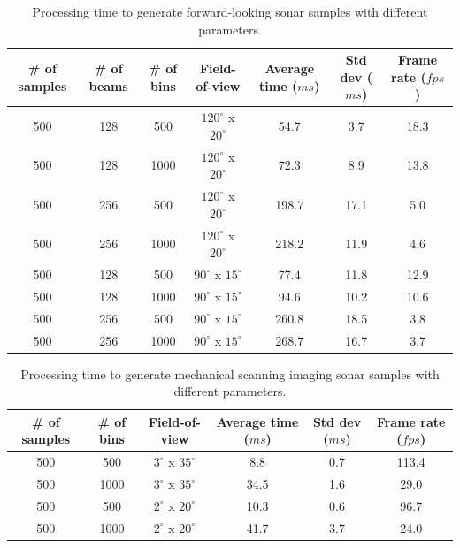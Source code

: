 \documentclass[final,5p,times]{elsarticle}
\begin{document}
\begin{table}[t]
    \caption{Processing time to generate forward-looking sonar samples with different parameters.}
    \captionsetup{justification=justified}
    \label{table:fls}
    \begin{center}
        \begin{tabular}{| c | c | c | c | c | c | c |}
            \hline
            \# of samples & \# of beams & \# of bins & Field-of-view & Average time ($ms$) & Std dev ($ms$) & Frame rate ($fps$) \\
            \hline
            500     & 128     & 500       & $120^{\circ}$ x $20^{\circ}$        & 54.7    & 3.7   & 18.3 \\ \hline
            500     & 128     & 1000      & $120^{\circ}$ x $20^{\circ}$        & 72.3	& 8.9   & 13.8 \\ \hline
            500     & 256     & 500       & $120^{\circ}$ x $20^{\circ}$        & 198.7	& 17.1  & 5.0  \\ \hline
            500     & 256     & 1000      & $120^{\circ}$ x $20^{\circ}$        & 218.2	& 11.9  & 4.6  \\ \hline
            500     & 128     & 500       & $90^{\circ}$ x $15^{\circ}$         & 77.4	& 11.8  & 12.9 \\ \hline
            500     & 128     & 1000      & $90^{\circ}$ x $15^{\circ}$         & 94.6	& 10.2  & 10.6 \\ \hline
            500     & 256     & 500       & $90^{\circ}$ x $15^{\circ}$         & 260.8	& 18.5  & 3.8  \\ \hline
            500     & 256     & 1000      & $90^{\circ}$ x $15^{\circ}$         & 268.7	& 16.7  & 3.7  \\ \hline
        \end{tabular}
    \end{center}
\end{table}

\begin{table}
    \caption{Processing time to generate mechanical scanning imaging sonar samples with different parameters.}
    \captionsetup{justification=justified}
    \label{table:msis}
    \begin{center}
        \begin{tabular}{| c | c | c | c | c | c |}
            \hline
            \# of samples & \# of bins & Field-of-view & Average time ($ms$) & Std dev ($ms$) & Frame rate ($fps$) \\
            \hline
            500     & 500       & $3^{\circ}$ x $35^{\circ}$        & 8.8	    & 0.7  & 113.4 \\ \hline
            500     & 1000      & $3^{\circ}$ x $35^{\circ}$        & 34.5	& 1.6  & 29.0  \\ \hline
            500     & 500       & $2^{\circ}$ x $20^{\circ}$        & 10.3	& 0.6  & 96.7  \\ \hline
            500     & 1000      & $2^{\circ}$ x $20^{\circ}$        & 41.7	& 3.7  & 24.0  \\ \hline
        \end{tabular}
    \end{center}
\end{table}
\end{document}
